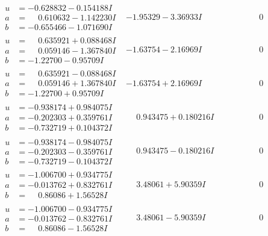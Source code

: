 \documentclass[1p]{elsarticle_modified}
\theoremstyle{definition}
\begin{document}
$$\begin{array}{c|c|c}
\begin{aligned}
u &= -0.628832 - 0.154188 I \\
a &= \phantom{-}0.610632 - 1.142230 I \\
b &= -0.655466 - 1.071690 I\end{aligned}
 & -1.95329 - 3.36933 I & \phantom{-0.000000 } 0 \\ \hline\begin{aligned}
u &= \phantom{-}0.635921 + 0.088468 I \\
a &= \phantom{-}0.059146 - 1.367840 I \\
b &= -1.22700 - 0.95709 I\end{aligned}
 & -1.63754 - 2.16969 I & \phantom{-0.000000 } 0 \\ \hline\begin{aligned}
u &= \phantom{-}0.635921 - 0.088468 I \\
a &= \phantom{-}0.059146 + 1.367840 I \\
b &= -1.22700 + 0.95709 I\end{aligned}
 & -1.63754 + 2.16969 I & \phantom{-0.000000 } 0 \\ \hline\begin{aligned}
u &= -0.938174 + 0.984075 I \\
a &= -0.202303 + 0.359761 I \\
b &= -0.732719 + 0.104372 I\end{aligned}
 & \phantom{-}0.943475 + 0.180216 I & \phantom{-0.000000 } 0 \\ \hline\begin{aligned}
u &= -0.938174 - 0.984075 I \\
a &= -0.202303 - 0.359761 I \\
b &= -0.732719 - 0.104372 I\end{aligned}
 & \phantom{-}0.943475 - 0.180216 I & \phantom{-0.000000 } 0 \\ \hline\begin{aligned}
u &= -1.006700 + 0.934775 I \\
a &= -0.013762 + 0.832761 I \\
b &= \phantom{-}0.86086 + 1.56528 I\end{aligned}
 & \phantom{-}3.48061 + 5.90359 I & \phantom{-0.000000 } 0 \\ \hline\begin{aligned}
u &= -1.006700 - 0.934775 I \\
a &= -0.013762 - 0.832761 I \\
b &= \phantom{-}0.86086 - 1.56528 I\end{aligned}
 & \phantom{-}3.48061 - 5.90359 I & \phantom{-0.000000 } 0\\

\end{array}$$
\end{document}
